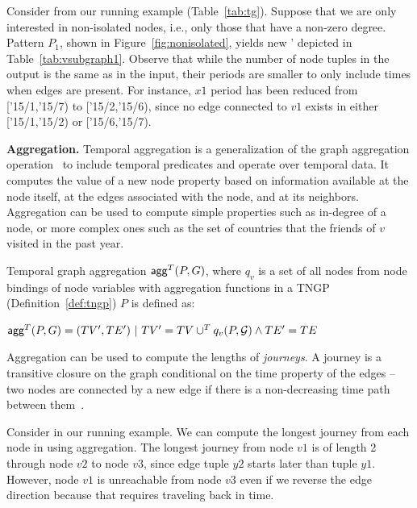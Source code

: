 \vspace{-0.2cm}
\begin{example}
Consider \tg \ttt from our running example (Table~\ref{tab:tg}).
Suppose that we are only interested in non-isolated nodes, i.e.,
only those that have a non-zero degree.  Pattern $P_1$, shown in
Figure~\ref{fig:nonisolated}, yields new \tg \ttt' depicted in
Table~\ref{tab:vsubgraph1}.  Observe that while the number of node
tuples in the output is the same as in the input, their periods are
smaller to only include times when edges are present.  For instance,
$x1$ period has been reduced from ['15/1,'15/7) to ['15/2,'15/6),
    since no edge connected to $v1$ exists in either ['15/1,'15/2)
      or ['15/6,'15/7).
\end{example}

{\bf Aggregation.}  Temporal aggregation is a generalization of the
graph aggregation operation~\cite{Wood2012} to include temporal
predicates and operate over temporal data.  It computes the value of a
new node property based on information available at the node itself,
at the edges associated with the node, and at its neighbors.
Aggregation can be used to compute simple properties such as in-degree
of a node, or more complex ones such as the set of countries that the
friends of $v$ visited in the past year.

\begin{definition}[Aggregation]
\label{def:tgagg}
Temporal graph aggregation $\textsf{agg}^T(P,G)$, where $q_v$ is a set
of all nodes from node bindings of node variables with aggregation
functions in a TNGP (Definition~\ref{def:tngp}) $P$ is defined as:

$\textsf{agg}^T(P,G) = (TV',TE') ~|~ TV' = TV \cup^T q_v(P,\mathcal{G}) \land TE' = TE$
\end{definition}

Aggregation can be used to compute the lengths of {\em journeys}.  A
journey is a transitive closure on the graph conditional on the time
property of the edges -- two nodes are connected by a new edge if
there is a non-decreasing time path between
them~\cite{Casteigts2011,Ferreira2004}.

\begin{example}
Consider \tg \ttt in our running example.  We can compute the longest
journey from each node in \ttt using aggregation.  The longest journey
from node $v1$ is of length 2 through node $v2$ to node $v3$, since
edge tuple $y2$ starts later than tuple $y1$.  However, node $v1$ is
unreachable from node $v3$ even if we reverse the edge direction because
that requires traveling back in time.
\end{example}

